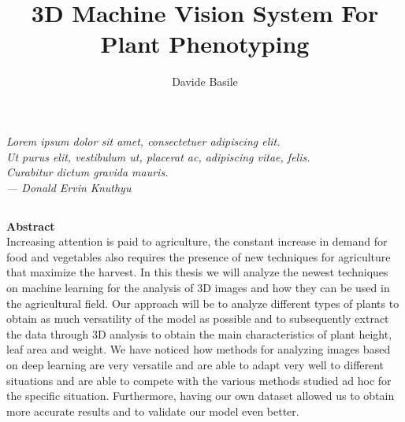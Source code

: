 \documentclass[a4paper,12pt,oneside]{book}
\title{3D Machine Vision System For Plant Phenotyping}
\author{Davide Basile}
\theoremstyle{definition}
\theoremstyle{definition}
\newcommand\blankpage{%
	\clearpage
	\thispagestyle{plain}
	\null
	\newpage}
\begin{document}
	

	\thispagestyle{plain}
	
	\frontmatter
	\blankpage
	

	\thispagestyle{plain}
	\null\vspace{\stretch{1}}
	\begin{flushright}
			\slshape
			Lorem ipsum dolor sit amet, consectetuer adipiscing elit. \\
			Ut purus elit, vestibulum ut, placerat ac, adipiscing vitae, felis. \\
			Curabitur dictum gravida mauris. \\ \medskip
		--- Donald Ervin Knuthyu
	\end{flushright}
	
	\null
	\blankpage
	
	
	
	\newpage
	

	\thispagestyle{plain}
	\begin{center}
		\chapter*{}
		{\Huge \textbf{Abstract}}\\
		Increasing attention is paid to agriculture, the constant increase in demand for food and vegetables also requires the presence of new techniques for agriculture
		that maximize the harvest. In this thesis we will analyze the newest techniques on machine learning for the analysis of 3D images and how they can be used in the
		agricultural field. Our approach will be to analyze different types of plants to obtain as much versatility of the model as possible and to subsequently extract
		the data through 3D analysis to obtain the main characteristics of plant height, leaf area and weight. We have noticed how methods for analyzing images based
		on deep learning are very versatile and are able to adapt very well to different situations and are able to compete with the various methods studied ad hoc for
		the specific situation. Furthermore, having our own dataset allowed us to obtain more accurate results and to validate our model even better.
		\vspace{15mm}
	\end{center}
	\blankpage	
	
\end{document}
